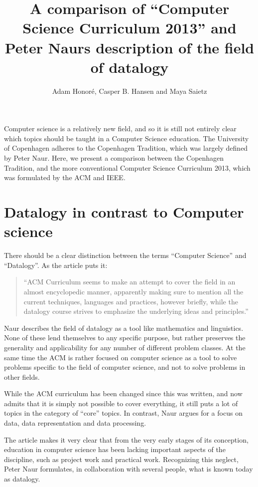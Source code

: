 \documentclass{article}
\title{A comparison of “Computer Science Curriculum 2013” and Peter Naurs description of the field of datalogy}
\author{Adam Honoré, Casper B. Hansen and Maya Saietz}
\begin{document}
\maketitle

\noindent Computer science is a relatively new field, and so it is still not entirely clear which topics should be taught in a
Computer Science education. The University of Copenhagen adheres to the Copenhagen Tradition, which was largely defined
by Peter Naur. Here, we present a comparison between the Copenhagen Tradition, and the more conventional Computer
Science Curriculum 2013, which was formulated by the ACM and IEEE.

\section{Datalogy in contrast to Computer science}
There should be a clear distinction between the terms ``Computer Science'' and ``Datalogy''. As the article\cite{froekjaer88} puts it:

\begin{quote}
    ``ACM Curriculum seems to make an attempt to cover the field in an almost encyclopedic manner, apparently making sure to
    mention all the current techniques, languages and practices, however briefly, while the datalogy course strives to
    emphasize the underlying ideas and principles.''
\end{quote}

Naur describes the field of datalogy as a tool like mathematics and linguistics. None of these lend themselves to any
specific purpose, but rather preserves the generality and applicability for any number of different problem classes. At
the same time the ACM is rather focused on computer science as a tool to solve problems specific to the field of
computer science, and not to solve problems in other fields.

While the ACM curriculum has been changed since this was written, and now admits that it is simply not possible to cover
everything, it still puts a lot of topics in the category of ``core'' topics. In contrast, Naur argues for a focus on
data, data representation and data processing\cite{naur66}.

The article\cite{froekjaer88} makes it very clear that from the very early stages of its conception, education in computer science has
been lacking important aspects of the discipline, such as project work and practical work. Recognizing this neglect,
Peter Naur formulates, in collaboration with several people, what is known today as datalogy.
\end{document}

